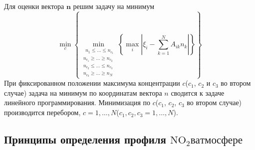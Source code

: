\documentclass[a4paper,14pt]{article}
\theoremstyle{plain}
\theoremstyle{definition}
\theoremstyle{remark}
\begin{document}
Для оценки вектора $\textbf{n}$ решим задачу на минимум
\begin{equation}
\min_{c}
\left\{
\min_{\substack{
\; \, n_1 \leq \ldots \leq n_{c_1} \\
n_{c_1} \geq \ldots \geq n_{c_2} \\
n_{c_2} \leq \ldots \leq n_{c_3} \\
n_{c_3} \geq \ldots \geq n_{N}}
}
\left\{
\max_i
\left|
\xi_i -
\sum_{k=1}^{N}
A_{ik}n_k
\right|
\right\}
\right\}
\label{post_3}
\end{equation}
При фиксированном положении максимума концентрации 
$c$($c_1$, $c_2$ и $c_3$ во втором случае)
задача на минимум по координатам вектора $n$ сводится к задаче
линейного программирования. Минимизация по $c$($c_1$, $c_2$,
$c_3$ во втором случае) производится перебором, 
$c=1, \ldots,N$($c_1, c_2, c_3=1, \ldots,N$).


\subsection{Принципы определения профиля $\text{NO}_2 в атмосфере$}
\end{document}
